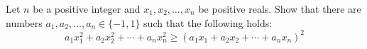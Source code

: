 Let $n$ be a positive integer and $x_1,x_2,\ldots,x_n$ be positive reals. Show that there are numbers $a_1,a_2,\ldots, a_n \in \{-1,1\}$ such that the following holds:\[a_1x_1^2+a_2x_2^2+\cdots+a_nx_n^2 \ge (a_1x_1+a_2x_2 +\cdots+a_nx_n)^2\]